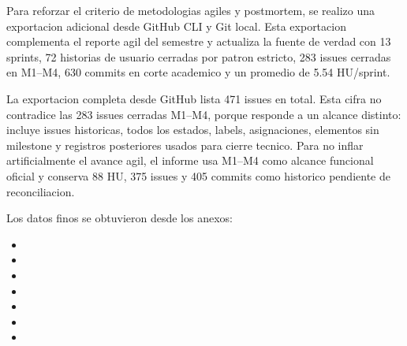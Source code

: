 \documentclass[11pt,a4paper]{article}
\begin{document}
Para reforzar el criterio de metodologias agiles y postmortem, se realizo una exportacion adicional desde GitHub CLI y Git local. Esta exportacion complementa el reporte agil del semestre y actualiza la fuente de verdad con 13 sprints, 72 historias de usuario cerradas por patron estricto, 283 issues cerradas en M1--M4, 630 commits en corte academico y un promedio de 5.54 HU/sprint.

La exportacion completa desde GitHub lista 471 issues en total. Esta cifra no contradice las 283 issues cerradas M1--M4, porque responde a un alcance distinto: incluye issues historicas, todos los estados, labels, asignaciones, elementos sin milestone y registros posteriores usados para cierre tecnico. Para no inflar artificialmente el avance agil, el informe usa M1--M4 como alcance funcional oficial y conserva 88 HU, 375 issues y 405 commits como historico pendiente de reconciliacion.

Los datos finos se obtuvieron desde los anexos:

\begin{itemize}[leftmargin=*]
    \item {}
    \item {}
    \item {}
    \item {}
    \item {}
    \item {}
    \item {}
\end{itemize}
\end{document}
